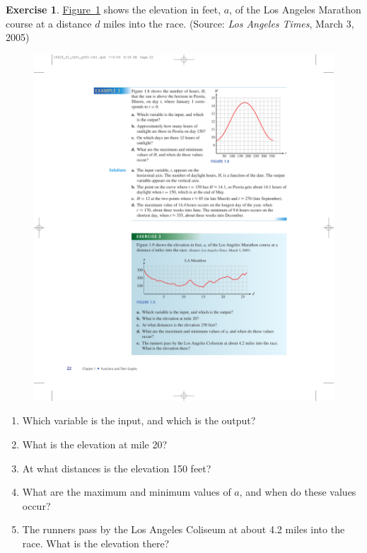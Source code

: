 \documentclass[10pt,]{book}
\theoremstyle{plain}
\theoremstyle{definition}
\theoremstyle{definition}
\theoremstyle{definition}
\theoremstyle{definition}
\newtheorem{exercise}[theorem]{Exercise}
\numberwithin{equation}{part}
\begin{document}
\begin{exercise}\label{exercise-LA-marathon}
\hyperref[fig-LA-marathon]{Figure~\ref{fig-LA-marathon}}  shows the elevation in feet, \(a\), of the Los Angeles Marathon course at a distance \(d\) miles into the race. (Source: \emph{Los Angeles Times}, March 3, 2005) \begin{figure}
\centering
\includegraphics[width=1\linewidth]{images/fig-LA-marathon}
\caption{\label{fig-LA-marathon}}
\end{figure}
\leavevmode%
\begin{enumerate}[label=\alph*]
\item\hypertarget{li-281}{}Which variable is the input, and which is the output?%
\item\hypertarget{li-282}{}What is the elevation at mile 20?%
\item\hypertarget{li-283}{}At what distances is the elevation 150 feet?%
\item\hypertarget{li-284}{}What are the maximum and minimum values of \(a\), and when do these values occur?%
\item\hypertarget{li-285}{}The runners pass by the Los Angeles Coliseum at about 4.2 miles into the race. What is the elevation there?%
\end{enumerate}
\end{exercise}
\typeout{************************************************}
\typeout{************************************************}
\end{document}
